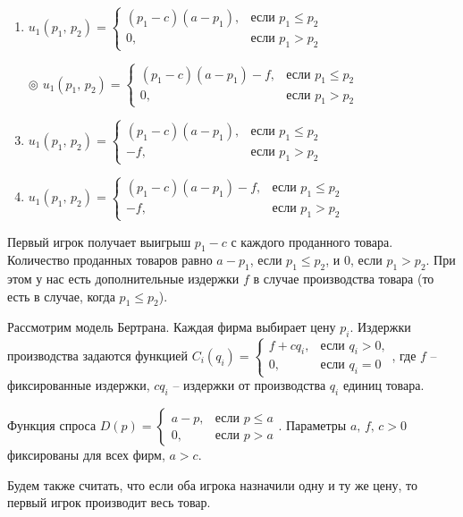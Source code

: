 	\begin{enumerate}[label=$\circ$]
		\item $u_1 (p_1,\, p_2) = \begin{cases}
		(p_1 - c)(a - p_1), & \text{если } p_1 \leq p_2 \\
		0, & \text{если } p_1 > p_2
		\end{cases}$
		\item[$\circledcirc$] $u_1 (p_1,\, p_2) = \begin{cases}
		(p_1 - c)(a - p_1) - f, & \text{если } p_1 \leq p_2 \\
		0, & \text{если } p_1 > p_2
		\end{cases}$
		\item $u_1 (p_1,\, p_2) = \begin{cases}
		(p_1 - c)(a - p_1), & \text{если } p_1 \leq p_2 \\
		-f, & \text{если } p_1 > p_2
		\end{cases}$
		\item $u_1 (p_1,\, p_2) = \begin{cases}
		(p_1 - c)(a - p_1) - f, & \text{если } p_1 \leq p_2 \\
		-f, & \text{если } p_1 > p_2
		\end{cases}$
	\end{enumerate}

	\solution
	Первый игрок получает выигрыш $p_1-c$ с каждого проданного товара. Количество проданных товаров равно $a-p_1$, если $p_1 \leq p_2$, и $0$, если $p_1 > p_2$. При этом у нас есть дополнительные издержки $f$ в случае производства товара (то есть в случае, когда $p_1 \leq p_2$).
	
	\task
	Рассмотрим модель Бертрана. Каждая фирма выбирает цену $p_i$. Издержки производства задаются функцией 
	$C_i (q_i) = \begin{cases}
	f + c q_i, & \text{если } q_i > 0, \\
	0, & \text{если } q_i = 0
	\end{cases}$, где $f$ -- фиксированные издержки, $c q_i$ -- издержки от производства $q_i$ единиц товара.
	
	Функция спроса $D(p) = \begin{cases}
	a - p, & \text{если } p \leq a \\
	0, & \text{если } p > a
	\end{cases}$. Параметры $a,\, f,\, c > 0$ фиксированы для всех фирм, $a > c$.
	
	Будем также считать, что если оба игрока назначили одну и ту же цену, то первый игрок производит весь товар.
	
